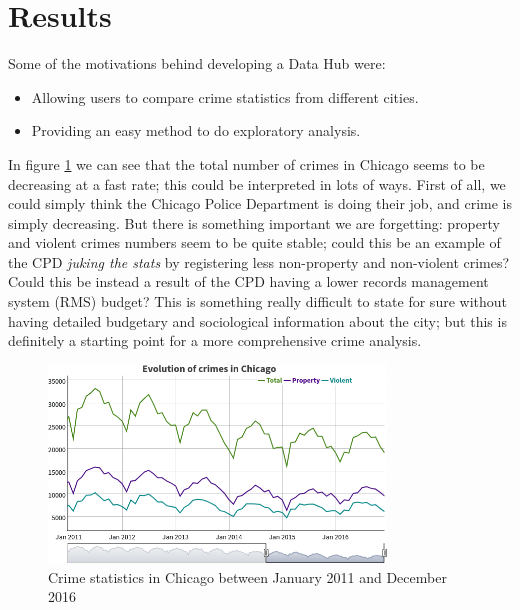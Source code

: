 \section{Results}\label{sec:results}

Some of the motivations behind developing a Data Hub were:
\begin{itemize}
    \item Allowing users to compare crime statistics from different cities.
    \item Providing an easy method to do exploratory analysis.
\end{itemize}

In figure \ref{fig:single-chicago} we can see that the total number of crimes in Chicago seems to be decreasing at a fast rate; this could be interpreted in lots of ways. First of all, we could simply think the Chicago Police Department is doing their job, and crime is simply decreasing. But there is something important we are forgetting: property and violent crimes numbers seem to be quite stable; could this be an example of the CPD \emph{juking the stats} by registering less non-property and non-violent crimes? Could this be instead a result of the CPD having a lower records management system (RMS) budget? This is something really difficult to state for sure without having detailed budgetary and sociological information about the city; but this is definitely a starting point for a more comprehensive crime analysis.

\begin{figure}[H]
	\centering
	\includegraphics[width=0.8\textwidth]{images/single-chicago}
	\caption{Crime statistics in Chicago between January 2011 and December 2016}
	\label{fig:single-chicago}
\end{figure}

